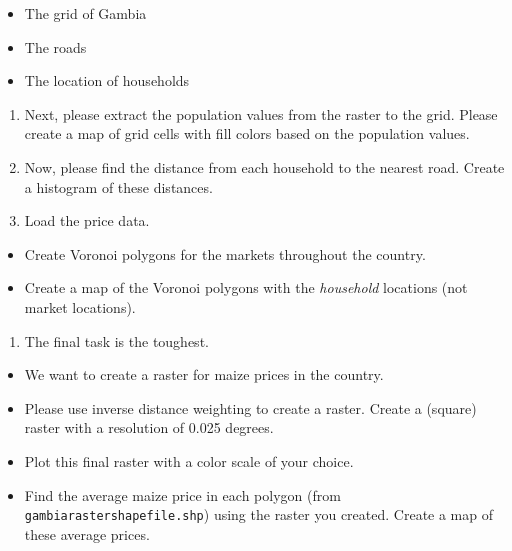 \documentclass[
]{article}
\providecommand{\tightlist}{%
  \setlength{\itemsep}{0pt}\setlength{\parskip}{0pt}}
\begin{document}
\begin{itemize}
\tightlist
\item
  The grid of Gambia
\item
  The roads
\item
  The location of households
\end{itemize}

\begin{enumerate}
\def\labelenumi{\arabic{enumi}.}
\setcounter{enumi}{1}
\item
  Next, please extract the population values from the raster to the grid. Please create a map of grid cells with fill colors based on the population values.
\item
  Now, please find the distance from each household to the nearest road. Create a histogram of these distances.
\item
  Load the price data.
\end{enumerate}

\begin{itemize}
\tightlist
\item
  Create Voronoi polygons for the markets throughout the country.
\item
  Create a map of the Voronoi polygons with the \emph{household} locations (not market locations).
\end{itemize}

\begin{enumerate}
\def\labelenumi{\arabic{enumi}.}
\setcounter{enumi}{4}
\tightlist
\item
  The final task is the toughest.
\end{enumerate}

\begin{itemize}
\tightlist
\item
  We want to create a raster for maize prices in the country.
\item
  Please use inverse distance weighting to create a raster. Create a (square) raster with a resolution of 0.025 degrees.
\item
  Plot this final raster with a color scale of your choice.
\item
  Find the average maize price in each polygon (from \texttt{gambiarastershapefile.shp}) using the raster you created. Create a map of these average prices.
\end{itemize}
\end{document}
